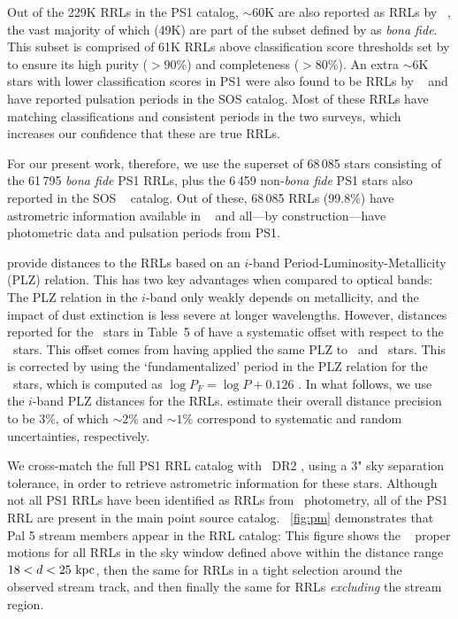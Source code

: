 \documentclass[twocolumn]{aastex63}
\begin{document}
Out of the 229K RRLs in the PS1 catalog, $\sim60$K are also reported as RRLs by \Gaia~, the vast majority of which (49K) are part of the subset defined by \citet{Sesar:2017b} as \emph{bona fide}. This subset is comprised of 61K RRLs above classification score thresholds set by \citet{Sesar:2017b} to ensure its high purity ($>90$\%) and completeness ($>80$\%). An extra $\sim6$K stars with lower classification scores in PS1 were also found to be RRLs by \Gaia~ and have reported pulsation periods in the SOS catalog. Most of these RRLs have matching classifications and consistent periods in the two surveys, which increases our confidence that these are true RRLs.

For our present work, therefore, we use the superset of 68\,085 stars consisting of the 61\,795 \emph{bona fide} PS1 RRLs, plus the 6\,459 non-\emph{bona fide} PS1 stars also reported in the SOS \Gaia~ catalog. Out of these, 68\,085 RRLs (99.8\%) have astrometric information available in \Gaia~ and all---by construction---have photometric data and pulsation periods from PS1.

\citet{Sesar:2017b} provide distances to the RRLs based on an $i$-band Period-Luminosity-Metallicity (PLZ) relation.
This has two key advantages when compared to optical bands: The PLZ relation in the $i$-band only weakly depends on metallicity, and the impact of dust extinction is less severe at longer wavelengths.
However, distances reported for the \rrc~stars in Table~5 of \citet{Sesar:2017b} have a systematic offset with respect to the \typeab~stars.
This offset comes from having applied the same PLZ to \typeab~and \typec~stars.
This is corrected by using the `fundamentalized' period in the PLZ relation for the \rrc~stars, which is computed as $\log{P_F} = \log P + 0.126$ \citep[following][]{Braga2016}.
In what follows, we use the $i$-band PLZ distances for the RRLs.
\citet{Sesar:2017b} estimate their overall distance precision to be 3\%, of which $\sim2$\% and $\sim1$\% correspond to systematic and random uncertainties, respectively.

We cross-match the full PS1 RRL catalog with \Gaia~DR2 \citep{Gaia:2018}, using a 3" sky separation tolerance, in order to retrieve astrometric information for these stars.
Although not all PS1 RRLs have been identified as RRLs from \Gaia\ photometry, all of the PS1 RRL are present in the main point source catalog.
\figurename~\ref{fig:pm} demonstrates that Pal 5 stream members appear in the RRL catalog: This figure shows the \Gaia\  proper motions for all RRLs in the sky window defined above within the distance range $18 < d < 25~\mathrm{kpc}$, then the same for RRLs in a tight selection around the observed stream track, and then finally the same for RRLs \emph{excluding} the stream region.
\end{document}
